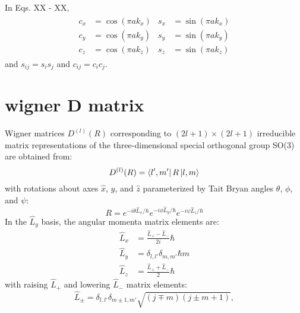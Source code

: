 \documentclass[preprint,showpacs,preprintnumbers,superscriptaddress,prb,floatfix,aps]{revtex4-1}
\begin{document}
In Eqs. XX - XX,
\begin{align}
\begin{split}
c_x &= \cos(\pi a k_x) \\
c_y &= \cos(\pi a k_y) \\
c_z &= \cos(\pi a k_z)
\end{split}
\begin{split}
s_x &= \sin(\pi a k_x) \\
s_y &= \sin(\pi a k_y) \\
s_z &= \sin(\pi a k_z)
\end{split}
\end{align}
and
$s_{ij} = s_i s_j$ and $c_{ij} = c_i c_j$.





%
%
\section{wigner D matrix}
Wigner matrices $D^{(l)}(R)$ corresponding to $(2l+1)\times(2l+1)$ irreducible matrix representations of the three-dimensional special orthogonal group SO(3) are obtained from:\cite{martin_electronic_2004}
\begin{equation}
\label{eq:imselfenergy}
D^{(l)}(R) = \bra{l',m'} R \ket{l,m}
\end{equation}
with rotations about axes $\hat{x}$, $\hat{y}$, and $\hat{z}$ parameterized by Tait Bryan angles $\theta$, $\phi$, and $\psi$:
\begin{equation}
R = e^{-i\theta\hat{L}_x/\hbar} e^{-i\phi\hat{L}_y/\hbar} e^{-i\psi\hat{L}_z/\hbar}
\end{equation}
%
In the $\hat{L}_y$ basis, the angular momenta matrix elements are:\cite{shankar_fundamentals_2014}
\begin{align}
\label{eq:angular_momenta}
\hat{L}_x & = \frac{\hat{L}_{+}-\hat{L}_{-}}{2i} \hbar \\
\hat{L}_y & = \delta_{l,l'}\delta_{m,m'} \hbar m \\
\hat{L}_z & = \frac{\hat{L}_{+}+\hat{L}_{-}}{2} \hbar
\end{align}
with raising $\hat{L}_+$ and lowering $\hat{L}_-$ matrix elements:
\begin{equation}
\label{eq:raising_lowering_operator}
\hat{L}_{\pm} = \delta_{l,l'}\delta_{m\pm1,m'} \sqrt{(j\mp m)(j\pm m+1)} ,
\end{equation}
\end{document}
